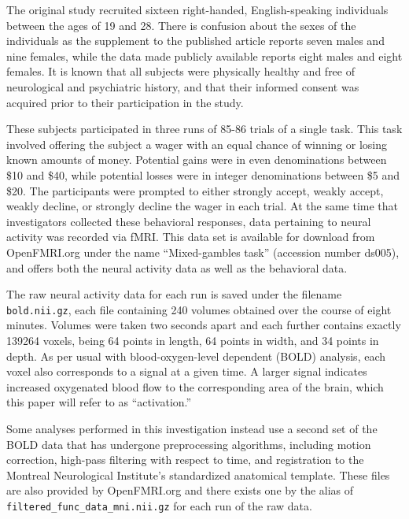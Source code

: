 
\par The original study recruited sixteen right-handed, English-speaking
individuals between the ages of 19 and 28. There is confusion about the sexes of
the individuals as the supplement to the published article reports seven males
and nine females, while the data made publicly available reports eight males and
eight females. It is known that all subjects were physically healthy and free of
neurological and psychiatric history, and that their informed consent was
acquired prior to their participation in the study.

\par \indent These subjects participated in three runs of 85-86 trials of a
single task. This task involved offering the subject a wager with an equal
chance of winning or losing known amounts of money. Potential gains were in even
denominations between \$10 and \$40, while potential losses were in integer
denominations between \$5 and \$20. The participants were prompted to either
strongly accept, weakly accept, weakly decline, or strongly decline the wager in
each trial. At the same time that investigators collected these behavioral
responses, data pertaining to neural activity was recorded via fMRI. This data
set is available for download from OpenFMRI.org under the name ``Mixed-gambles
task'' (accession number ds005), and offers both the neural activity data as
well as the behavioral data.

\par \indent The raw neural activity data for each run is saved under the
filename \texttt{bold.nii.gz}, each file containing 240 volumes obtained over
the course of eight minutes. Volumes were taken two seconds apart and each
further contains exactly 139264 voxels, being 64 points in length, 64 points in
width, and 34 points in depth. As per usual with blood-oxygen-level dependent
(BOLD) analysis, each voxel also corresponds to a signal at a given time. A
larger signal indicates increased oxygenated blood flow to the corresponding
area of the brain, which this paper will refer to as ``activation.''

\par \indent Some analyses performed in this investigation instead use a second
set of the BOLD data that has undergone preprocessing algorithms, including
motion correction, high-pass filtering with respect to time, and registration to
the Montreal Neurological Institute's standardized anatomical template. These
files are also provided by OpenFMRI.org and there exists one by the alias of
\texttt{filtered_func_data_mni.nii.gz} for each run of the raw data.

